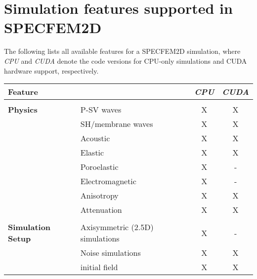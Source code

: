 
\chapter*{Simulation features supported in SPECFEM2D}


The following lists all available features for a SPECFEM2D simulation,
where {\it CPU} and {\it CUDA} denote the code versions for CPU-only simulations and
CUDA hardware support, respectively.
%
\begin{table}[htp]
\vspace{-1cm}
\label{table:features}
\begin{center}
\begin{tabular}{ l l c c}
\hline
{\bf Feature}   &   & {\it CPU} & {\it CUDA} \\
\hline
& & & \\
{\bf Physics}   & P-SV waves                & X  & X \\
                & SH/membrane waves         & X  & X \\
                & Acoustic                  & X  & X \\
                & Elastic                   & X  & X \\
                & Poroelastic               & X  & - \\
                & Electromagnetic           & X  & - \\
                & Anisotropy                & X  & X \\
                & Attenuation               & X  & X \\
\hline
& & & \\
{\bf Simulation Setup}  & Axisymmetric (2.5D) simulations   & X  & - \\
                        & Noise simulations                 & X  & X \\
                        & initial field                     & X  & X \\

\end{tabular}
\end{center}
\end{table}
